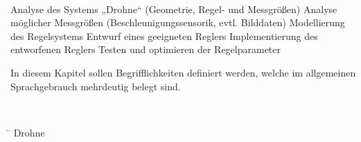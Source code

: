 


\missing\

Analyse des Systems „Drohne“ (Geometrie, Regel- und Messgrößen)
Analyse möglicher Messgrößen (Beschleunigungssensorik, evtl. Bilddaten)
Modellierung des Regelsystems
Entwurf eines geeigneten Reglers
Implementierung des entworfenen Reglers
Testen und optimieren der Regelparameter




In diesem Kapitel sollen Begrifflichkeiten definiert werden, welche im allgemeinen Sprachgebrauch mehrdeutig belegt sind.





\missing\

\begin{tabbing}
\hspace{8cm} \= \kill
Drohne \> \Quad\




\end{tabbing}

